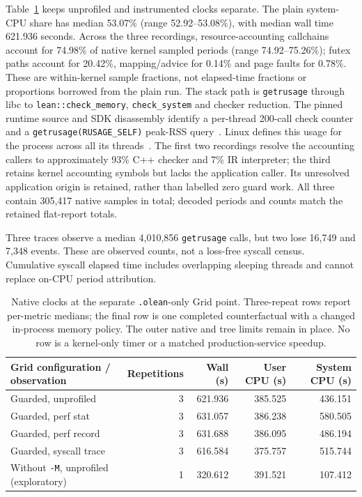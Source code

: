 \documentclass[10pt,twocolumn]{article}
\begin{document}
Table~\ref{tab:grid-guard-accounting} keeps unprofiled and instrumented clocks
separate. The plain system-CPU share has median 53.07\%
(range 52.92--53.08\%), with median wall time 621.936 seconds.
Across the three recordings, resource-accounting callchains account for
74.98\% of native kernel sampled periods (range 74.92--75.26\%);
futex paths account for 20.42\%, mapping/advice for 0.14\% and page faults
for 0.78\%. These are within-kernel sample fractions, not elapsed-time
fractions or proportions borrowed from the plain run.
The stack path is \texttt{getrusage} through libc to
\texttt{lean::check\_memory}, \texttt{check\_system} and checker reduction.
The pinned runtime source and SDK disassembly identify a per-thread
200-call check counter and a \texttt{getrusage(RUSAGE\_SELF)} peak-RSS
query~\cite{leanMemoryGuard2026}.
Linux defines this usage for the process across all its
threads~\cite{linuxGetrusage2026}.
The first two recordings resolve the accounting callers to approximately
93\% C++ checker and 7\% IR interpreter; the third retains kernel
accounting symbols but lacks the application caller.
Its unresolved application origin is retained, rather than labelled zero
guard work. All three contain 305,417 native samples in total; decoded
periods and counts match the retained flat-report totals.

Three traces observe a median 4,010,856 \texttt{getrusage} calls, but two
lose 16,749 and 7,348 events. These are observed counts, not a loss-free
syscall census. Cumulative syscall elapsed time includes overlapping
sleeping threads and cannot replace on-CPU period attribution.

\begin{table}[t]
\centering\small
\begin{tabular}{lrrrr}
\toprule
Grid configuration / observation & Repetitions & Wall (s) & User CPU (s) & System CPU (s)\\
\midrule
Guarded, unprofiled &3&621.936&385.525&436.151\\
Guarded, perf stat &3&631.057&386.238&580.505\\
Guarded, perf record &3&631.688&386.095&486.194\\
Guarded, syscall trace &3&616.584&375.757&515.744\\
Without \texttt{-M}, unprofiled (exploratory) &1&320.612&391.521&107.412\\
\bottomrule
\end{tabular}
\caption{Native clocks at the separate \texttt{.olean}-only Grid point.
Three-repeat rows report per-metric medians; the final row is one completed
counterfactual with a changed in-process memory policy.
The outer native and tree limits remain in place.
No row is a kernel-only timer or a matched production-service speedup.}
\label{tab:grid-guard-accounting}
\end{table}
\end{document}
